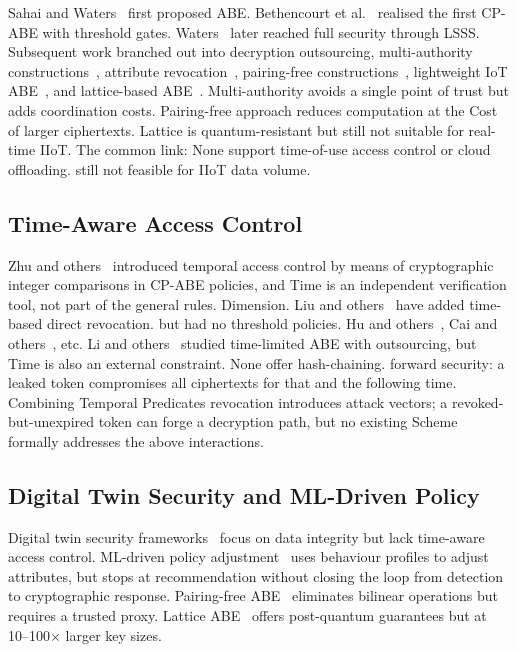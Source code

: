 \documentclass[lettersize,journal]{IEEEtran}
\begin{document}
Sahai and Waters~\cite{Sahai2005} first proposed ABE. Bethencourt et
al.~\cite{Bethencourt2007} realised the first CP-ABE with threshold gates.
Waters~\cite{Waters2011} later reached full security through LSSS.
Subsequent work branched out into decryption outsourcing, multi-authority
constructions~\cite{Wu2025_DecentralizedMAABE,
Zhang2026_MultiAuthority, Penuelas2024_MultiAuthority,
Datta2025_Decentralized}, attribute revocation~\cite{Liu2023_Revocation, Ghopur2023},
pairing-free constructions~\cite{Guo2024, Zhang2024_TDSC}, lightweight IoT ABE~\cite{Shruti2023, Burgos2024}, and lattice-based
ABE~\cite{Gasparini2026_LatticeBenchmark, Purnima2025_PQSurvey}. Multi-authority avoids a single point of trust
but adds coordination costs. Pairing-free approach reduces computation
at the Cost of larger ciphertexts. Lattice is quantum-resistant but
still not suitable for real-time IIoT. The common link: None support
time-of-use access control or cloud offloading. still not feasible for
IIoT data volume.

\subsection{Time-Aware Access Control}
\label{subsec:time_access}

Zhu and others~\cite{Zhu2012} introduced temporal access control by means of cryptographic integer comparisons in CP-ABE policies, and
Time is an independent verification tool, not part of the general rules.
Dimension. Liu and others~\cite{Liu2018_ACNS} have added time-based direct revocation.
but had no threshold policies. Hu and others~\cite{Hu2024_TAAC},
Cai and others~\cite{Cai2023_TimeABE}, etc.
Li and others~\cite{Li2023_HierarchicalABE} studied time-limited ABE with outsourcing, but
Time is also an external constraint. None offer hash-chaining.
forward security: a leaked token compromises all ciphertexts
for that and the following time. Combining Temporal Predicates
revocation introduces attack vectors; a revoked-but-unexpired token can forge a decryption path, but no existing
Scheme formally addresses the above interactions.

\subsection{Digital Twin Security and ML-Driven Policy}
\label{subsec:dt_security}

Digital twin security frameworks~\cite{Lu2020_DTSecurity, Mun2025_DTSurvey, Dai2024_FGCS}
focus on data integrity but lack time-aware access control.
ML-driven policy adjustment~\cite{Khan2025_HybridABAC, Rahman2025_TrustEdge}
uses behaviour profiles to adjust attributes, but stops at recommendation
without closing the loop from detection to cryptographic response.
Pairing-free ABE~\cite{Chen2025_PairingFree} eliminates bilinear
operations but requires a trusted proxy. Lattice
ABE~\cite{Gasparini2026_LatticeBenchmark, Purnima2025_PQSurvey} offers post-quantum guarantees
but at 10--100$\times$ larger key sizes.
\end{document}
